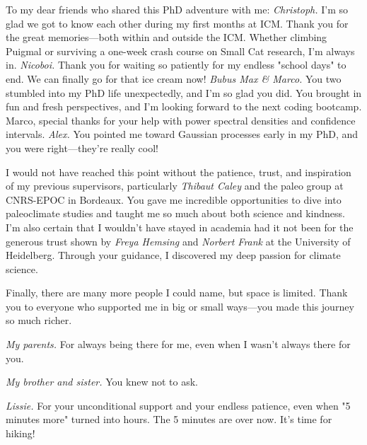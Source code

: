 \begin{acknowledgements}
To my dear friends who shared this PhD adventure with me: \emph{Christoph.} I'm so glad we got to know each other during my first months at ICM. Thank you for the great memories---both within and outside the ICM. Whether climbing Puigmal or surviving a one-week crash course on Small Cat research, I'm always in. \emph{Nicoboi.} Thank you for waiting so patiently for my endless "school days" to end. We can finally go for that ice cream now! \emph{Bubus Max \& Marco.} You two stumbled into my PhD life unexpectedly, and I'm so glad you did. You brought in fun and fresh perspectives, and I'm looking forward to the next coding bootcamp. Marco, special thanks for your help with power spectral densities and confidence intervals. \emph{Alex.} You pointed me toward Gaussian processes early in my PhD, and you were right---they're really cool!

I would not have reached this point without the patience, trust, and inspiration of my previous supervisors, particularly \emph{Thibaut Caley} and the paleo group at CNRS-EPOC in Bordeaux. You gave me incredible opportunities to dive into paleoclimate studies and taught me so much about both science and kindness. I'm also certain that I wouldn't have stayed in academia had it not been for the generous trust shown by \emph{Freya Hemsing} and \emph{Norbert Frank} at the University of Heidelberg. Through your guidance, I discovered my deep passion for climate science.

Finally, there are many more people I could name, but space is limited. Thank you to everyone who supported me in big or small ways---you made this journey so much richer.

\emph{My parents.} For always being there for me, even when I wasn't always there for you.

\emph{My brother and sister.} You knew not to ask.

\emph{Lissie.} For your unconditional support and your endless patience, even when "5 minutes more" turned into hours. The 5 minutes are over now. It's time for hiking!

\end{acknowledgements}
